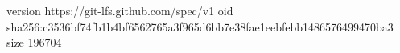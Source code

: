 version https://git-lfs.github.com/spec/v1
oid sha256:c3536bf74fb1b4bf6562765a3f965d6bb7e38fae1eebfebb1486576499470ba3
size 196704
